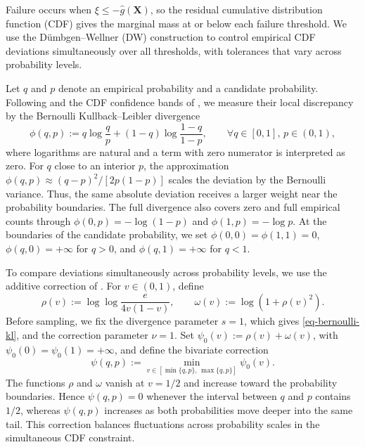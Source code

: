 \documentclass[review,11pt,3p,authoryear,nopreprintline]{elsarticle}
\begin{document}
Failure occurs when $\xi\le-\hat g(\bm X)$, so the residual cumulative distribution function (CDF) gives the marginal mass at or below each failure threshold. We use the D\"umbgen--Wellner (DW) construction \citep{L.J23} to control empirical CDF deviations simultaneously over all thresholds, with tolerances that vary across probability levels.

Let $q$ and $p$ denote an empirical probability and a candidate probability. Following \citet{B.J79} and the CDF confidence bands of \citet{O95}, we measure their local discrepancy by the Bernoulli Kullback--Leibler divergence
\begin{equation}
  \phi(q,p):=q\log\frac{q}{p}+(1-q)\log\frac{1-q}{1-p},\qquad \forall q\in[0,1],\, p\in(0,1),
  \label{eq-bernoulli-kl}
\end{equation}
where logarithms are natural and a term with zero numerator is interpreted as zero. For $q$ close to an interior $p$, the approximation $\phi(q,p)\approx(q-p)^2/[2p(1-p)]$ scales the deviation by the Bernoulli variance. Thus, the same absolute deviation receives a larger weight near the probability boundaries. The full divergence also covers zero and full empirical counts through $\phi(0,p)=-\log(1-p)$ and $\phi(1,p)=-\log p$. At the boundaries of the candidate probability, we set $\phi(0,0)=\phi(1,1)=0$, $\phi(q,0)=+\infty$ for $q>0$, and $\phi(q,1)=+\infty$ for $q<1$.

To compare deviations simultaneously across probability levels, we use the additive correction of \citet{L.J23}. For $v\in(0,1)$, define
\begin{equation*}
  \rho(v):=\log\log\frac{e}{4v(1-v)},\qquad \omega(v):=\log\!\left(1+\rho(v)^2\right).
\end{equation*}
Before sampling, we fix the divergence parameter $s=1$, which gives \eqref{eq-bernoulli-kl}, and the correction parameter $\nu=1$. Set $\psi_0(v):=\rho(v)+\omega(v)$, with $\psi_0(0)=\psi_0(1)=+\infty$, and define the bivariate correction
\begin{equation*}
  \psi(q,p):=\min_{v\in[\min\{q,p\},\,\max\{q,p\}]}\psi_0(v).
\end{equation*}
The functions $\rho$ and $\omega$ vanish at $v=1/2$ and increase toward the probability boundaries. Hence $\psi(q,p)=0$ whenever the interval between $q$ and $p$ contains $1/2$, whereas $\psi(q,p)$ increases as both probabilities move deeper into the same tail. This correction balances fluctuations across probability scales in the simultaneous CDF constraint.
\end{document}
